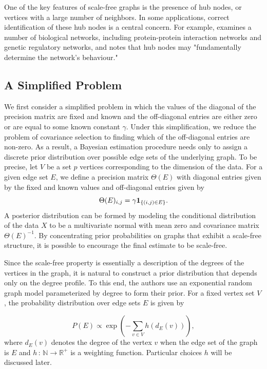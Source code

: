 \documentclass{uwstat572}
\theoremstyle{remark}
\theoremstyle{definition}
\begin{document}
One of the key features of scale-free graphs is the presence of hub nodes, or vertices with a large number of neighbors.  In some applications, correct identification of these hub nodes is a central concern.  For example, \cite{barabasi2004network} examines a number of biological networks, including protein-protein interaction networks and genetic regulatory networks, and notes that hub nodes may "fundamentally determine the network's behaviour."



\subsection{A Simplified Problem}

We first consider a simplified problem in which the values of the diagonal of the precision matrix are fixed and known and the off-diagonal entries are either zero or are equal to some known constant $\gamma$.  
Under this simplification, we reduce the problem of covariance selection to finding which of the off-diagonal entries are non-zero.  As a result, a Bayesian estimation procedure needs only to assign a discrete prior distribution over possible edge sets of the underlying graph. To be precise, let $V$ be a set $p$ vertices corresponding to the dimension of the data.  For a given edge set $E$, we define a precision matrix $\Theta(E)$ with diagonal entries given by the fixed and known values and off-diagonal entries given by
\begin{equation*}
    \Theta(E)_{i,j} = \gamma {\bf{1}}_{\{(i,j) \in E\}}.
\end{equation*}
A posterior distribution can be formed by modeling the conditional distribution of the data $X$ to be a multivariate normal with mean zero and covariance matrix $\Theta(E)^{-1}$.  By concentrating prior probabilities on graphs that exhibit a scale-free structure, it is possible to encourage the final estimate to be scale-free.

Since the scale-free property is essentially a description of the degrees of the vertices in the graph, it is natural to construct a prior distribution that depends only on the degree profile.  To this end, the authors use an exponential random graph model parameterized by degree to form their prior.  For a fixed vertex set $V$, the probability distribution over edge sets $E$ is given by

\begin{equation}\label{cprior}
P( E ) \propto \exp \left( - \sum_{v \in V} h(d_E(v)) \right),
\end{equation}
where $d_E(v)$ denotes the degree of the vertex $v$ when the edge set of the graph is $E$ and $h \, : \, \mathbb{N} \to \mathbb{R}^+$ is a weighting function.  Particular choices $h$ will be discussed later.
\end{document}
